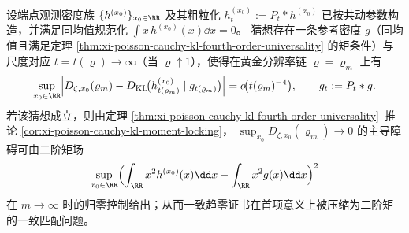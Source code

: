 \begin{conjecture}\label{conj:xi-comoving-defect-second-moment-dominance}
设端点观测密度族 \(\{h^{(x_0)}\}_{x_0\in\RR}\) 及其粗粒化 \(h_t^{(x_0)}:=P_t*h^{(x_0)}\) 已按共动参数构造，并满足同均值规范化 \(\int x\,h^{(x_0)}(x)\dd x=0\)。
猜想存在一条参考密度 \(g\)（同均值且满足定理 \ref{thm:xi-poisson-cauchy-kl-fourth-order-universality} 的矩条件）与尺度对应 \(t=t(\varrho)\to\infty\)（当 \(\varrho\uparrow 1\)），使得在黄金分辨率链 \(\varrho=\varrho_m\) 上有
\[
\sup_{x_0\in\RR}
\Bigl|
D_{\zeta,x_0}(\varrho_m)-D_{\mathrm{KL}}\!\bigl(h^{(x_0)}_{t(\varrho_m)}\mid g_{t(\varrho_m)}\bigr)
\Bigr|
=o\!\bigl(t(\varrho_m)^{-4}\bigr),
\qquad
g_t:=P_t*g.
\]
若该猜想成立，则由定理 \ref{thm:xi-poisson-cauchy-kl-fourth-order-universality}--推论 \ref{cor:xi-poisson-cauchy-kl-moment-locking}，
\(\sup_{x_0}D_{\zeta,x_0}(\varrho_m)\to 0\) 的主导障碍可由二阶矩场
\[
\sup_{x_0\in\RR}\Bigl(\int_{\RR}x^2h^{(x_0)}(x)\dd x-\int_{\RR}x^2g(x)\dd x\Bigr)^2
\]
在 \(m\to\infty\) 时的归零控制给出；从而一致趋零证书在首项意义上被压缩为二阶矩的一致匹配问题。
\end{conjecture}

\endinput
